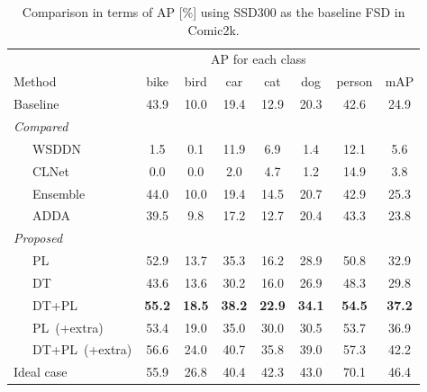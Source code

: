 \documentclass[10pt,twocolumn,letterpaper]{article}
\newcommand{\datasetcomic}{Comic2k}
\newcommand{\lvl}{~~~}
\begin{document}
 \begin{table}[t]
    \caption{Comparison in terms of AP [\%] using SSD300 as the baseline FSD in \datasetcomic.}
    \label{tbl:ap_on_each_class_bam_comic}
        \tabcolsep=1.5pt
        \centering
        \begin{tabular}{@{}lccccccc@{}}\toprule
        	& \multicolumn{6}{c}{AP for each class} & \\ \cmidrule(r){2-7}
        	Method & bike & bird & car & cat & dog & person & mAP \\ \midrule
        	Baseline & 43.9 & 10.0 & 19.4 & 12.9 & 20.3 & 42.6 & 24.9 \\ \midrule
        	\textit{Compared} & & & & & & & \\
            \lvl WSDDN~\cite{bilen2016weakly} & 1.5 & 0.1 & 11.9 & 6.9 & 1.4 & 12.1 & 5.6 \\
            \lvl CLNet~\cite{kantorov2016contextlocnet} & 0.0 & 0.0 & 2.0 & 4.7 & 1.2 & 14.9 & 3.8 \\
            \lvl Ensemble & 44.0 & 10.0 & 19.4 & 14.5 & 20.7 & 42.9 & 25.3 \\
            \lvl ADDA~\cite{tzeng2017adversarial} & 39.5 & 9.8 & 17.2 & 12.7 & 20.4 & 43.3 & 23.8 \\ \midrule
            \textit{Proposed} & & & & & & &\\
            \lvl PL & 52.9 & 13.7 & 35.3 & 16.2 & 28.9 & 50.8 & 32.9 \\
            \lvl DT & 43.6 & 13.6 & 30.2 & 16.0 & 26.9 & 48.3 & 29.8\\
            \lvl DT+PL & \textbf{55.2} & \textbf{18.5} & \textbf{38.2} & \textbf{22.9} & \textbf{34.1} & \textbf{54.5} & \textbf{37.2} \\ \midrule
            \lvl PL~(+extra) & 53.4 & 19.0 & 35.0 & 30.0 & 30.5 & 53.7 & 36.9 \\
            \lvl DT+PL~(+extra) & 56.6 & 24.0 & 40.7 & 35.8 & 39.0 & 57.3 & 42.2 \\ \midrule
            Ideal case & 55.9 & 26.8 & 40.4 & 42.3 & 43.0 & 70.1 & 46.4 \\ \bottomrule
        \end{tabular}
\end{table} 
\end{document}
